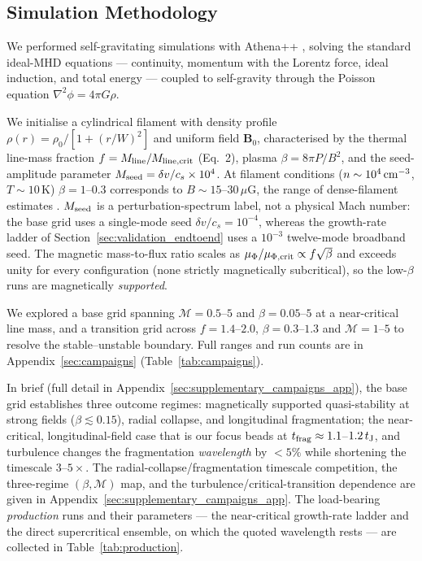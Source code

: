 \documentclass[usenatbib,twoside,twocolumn]{mnras}
\begin{document}
\subsection{Simulation Methodology}

We performed self-gravitating simulations with Athena++ \citep{Stone2020}, solving the standard ideal-MHD equations --- continuity, momentum with the Lorentz force, ideal induction, and total energy --- coupled to self-gravity through the Poisson equation $\nabla^2\phi=4\pi G\rho$.

We initialise a cylindrical filament with density profile $\rho(r)=\rho_0/[1+(r/W)^2]$ and uniform field $\mathbf{B}_0$, characterised by the thermal line-mass fraction $f=M_{\rm line}/M_{\rm line,crit}$ (Eq.~2), plasma $\beta=8\pi P/B^2$, and the seed-amplitude parameter $M_{\rm seed}=\delta v/c_s\times10^{4}$. At filament conditions ($n\sim10^4\,{\rm cm^{-3}}$, $T\sim10$\,K) $\beta=1$--$0.3$ corresponds to $B\sim15$--$30\,\mu$G, the range of dense-filament estimates \citep{Crutcher2012}. $M_{\rm seed}$ is a perturbation-spectrum label, not a physical Mach number: the base grid uses a single-mode seed $\delta v/c_s=10^{-4}$, whereas the growth-rate ladder of Section~\ref{sec:validation_endtoend} uses a $10^{-3}$ twelve-mode broadband seed. The magnetic mass-to-flux ratio scales as $\mu_\Phi/\mu_{\Phi,\rm crit}\propto f\sqrt{\beta}$ and exceeds unity for every configuration (none strictly magnetically subcritical), so the low-$\beta$ runs are magnetically \emph{supported}.

We explored a base grid spanning $\mathcal{M}=0.5$--$5$ and $\beta=0.05$--$5$ at a near-critical line mass, and a transition grid across $f=1.4$--$2.0$, $\beta=0.3$--$1.3$ and $\mathcal{M}=1$--$5$ to resolve the stable--unstable boundary. Full ranges and run counts are in Appendix~\ref{sec:campaigns} (Table~\ref{tab:campaigns}).

In brief (full detail in Appendix~\ref{sec:supplementary_campaigns_app}), the base grid establishes three outcome regimes: magnetically supported quasi-stability at strong fields ($\beta\lesssim0.15$), radial collapse, and longitudinal fragmentation; the near-critical, longitudinal-field case that is our focus beads at $t_{\rm frag}\approx1.1$--$1.2\,t_{\rm J}$, and turbulence changes the fragmentation \emph{wavelength} by $<5\%$ while shortening the timescale $3$--$5\times$. The radial-collapse/fragmentation timescale competition, the three-regime $(\beta,\mathcal{M})$ map, and the turbulence/critical-transition dependence are given in Appendix~\ref{sec:supplementary_campaigns_app}. The load-bearing \emph{production} runs and their parameters --- the near-critical growth-rate ladder and the direct supercritical ensemble, on which the quoted wavelength rests --- are collected in Table~\ref{tab:production}.
\end{document}

